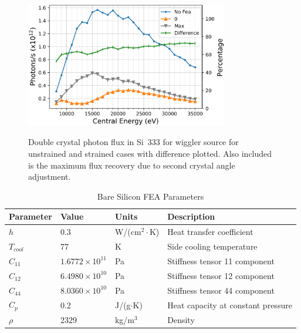 \documentclass{iucr}
\begin{document}
\begin{figure}
\caption{Double crystal photon flux in Si~333 for wiggler source for unstrained and strained cases with difference plotted. Also included is the maximum flux recovery due to second crystal angle adjustment.}
\includegraphics[width = 8.85cm]{images/ivw333flux.png}
\label{fig:ivw333flux}
\end{figure}

\begin{table}

\caption{Bare Silicon FEA Parameters}
\begin{tabular}{@{}llll@{}}
Parameter   & Value                   & Units                     & Description                        \\
\hline
$h$         & 0.3                     & W/(cm$^2\cdot$K)          & Heat transfer coefficient          \\
$T_{cool}$  & 77                      & K                         & Side cooling temperature           \\
$C_{11}$    & $1.6772\times 10^{11}$  & Pa                        & Stiffness tensor 11 component      \\
$C_{12}$    & $6.4980\times 10^{10}$  & Pa                        & Stiffness tensor 12 component      \\
$C_{44}$    & $8.0360\times 10^{10}$  & Pa                        & Stiffness tensor 44 component      \\
$C_p$       & 0.2                     & J/(g$\cdot$K)               & Heat capacity at constant pressure \\
$\rho$      &  2329                   & kg/m$^3$                  & Density                            \\
\end{tabular}
\label{baresiliconFEA}
\end{table}
\end{document}
